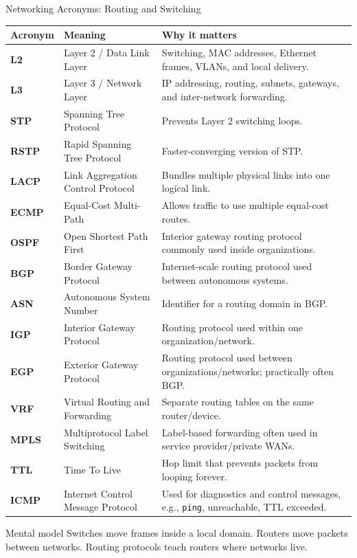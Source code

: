 \documentclass[aspectratio=169]{beamer}
\begin{document}
\begin{frame}{Networking Acronyms: Routing and Switching}
\tiny

\begin{tabular}{p{1.8cm} p{3.7cm} p{6.7cm}}
\toprule
\textbf{Acronym} & \textbf{Meaning} & \textbf{Why it matters} \\
\midrule
\textbf{L2} & Layer 2 / Data Link Layer & Switching, MAC addresses, Ethernet frames, VLANs, and local delivery. \\
\textbf{L3} & Layer 3 / Network Layer & IP addressing, routing, subnets, gateways, and inter-network forwarding. \\
\textbf{STP} & Spanning Tree Protocol & Prevents Layer 2 switching loops. \\
\textbf{RSTP} & Rapid Spanning Tree Protocol & Faster-converging version of STP. \\
\textbf{LACP} & Link Aggregation Control Protocol & Bundles multiple physical links into one logical link. \\
\textbf{ECMP} & Equal-Cost Multi-Path & Allows traffic to use multiple equal-cost routes. \\
\textbf{OSPF} & Open Shortest Path First & Interior gateway routing protocol commonly used inside organizations. \\
\textbf{BGP} & Border Gateway Protocol & Internet-scale routing protocol used between autonomous systems. \\
\textbf{ASN} & Autonomous System Number & Identifier for a routing domain in BGP. \\
\textbf{IGP} & Interior Gateway Protocol & Routing protocol used within one organization/network. \\
\textbf{EGP} & Exterior Gateway Protocol & Routing protocol used between organizations/networks; practically often BGP. \\
\textbf{VRF} & Virtual Routing and Forwarding & Separate routing tables on the same router/device. \\
\textbf{MPLS} & Multiprotocol Label Switching & Label-based forwarding often used in service provider/private WANs. \\
\textbf{TTL} & Time To Live & Hop limit that prevents packets from looping forever. \\
\textbf{ICMP} & Internet Control Message Protocol & Used for diagnostics and control messages, e.g., \texttt{ping}, unreachable, TTL exceeded. \\
\bottomrule
\end{tabular}

\vspace{0.12cm}

\begin{block}{Mental model}
Switches move frames inside a local domain. Routers move packets between networks. Routing protocols teach routers where networks live.
\end{block}

\end{frame}
\end{document}
